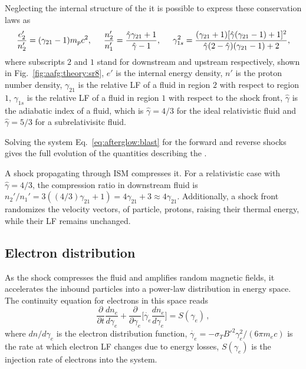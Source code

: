 Neglecting the internal structure of the \blast{} it is possible to express 
these conservation laws as \citep{Blandford:1976,Rezzolla:2013} 
\begin{equation}
\frac{e_2'}{n_2'} = (\gamma_{21} - 1)m_p c^2, \hspace{5mm}
\frac{n_2'}{n_1'} = \frac{\hat{\gamma}\gamma_{21} + 1}{\hat{\gamma}-1}, \hspace{5mm}
\gamma_{1s}^2 = \frac{(\gamma_{21} + 1) [\hat{\gamma}(\gamma_{21}-1)+1]^2}{\hat{\gamma}(2-\hat{\gamma})(\gamma_{21}-1)+2},
\label{eq:afterglow:blast}
\end{equation}
where subscripts $2$ and $1$ stand for downstream and upstream respectively, 
shown in Fig.~\ref{fig:aafg:theory:sr8}, 
$e'$ is the internal energy density, $n'$ is the proton number density, 
$\gamma_{21}$ is the relative \ac{LF} of a fluid in region $2$ with respect to region $1$, 
$\gamma_{1s}$ is the relative \ac{LF} of a fluid in region $1$ with respect to the shock front,
$\hat{\gamma}$ is the adiabatic index of a fluid, which is $\hat{\gamma}=4/3$ 
for the ideal relativistic fluid and $\hat{\gamma}=5/3$ for a subrelativisitc fluid.

Solving the system Eq.~\eqref{eq:afterglow:blast} for the 
forward and reverse shocks gives the full evolution of the quantities describing the \blast{}. 

A shock propagating through \ac{ISM} compresses it. 
For a relativistic case with $\hat{\gamma}=4/3$, the compression ratio in downstream fluid is 
$n_2'/n_1' = 3 ((4/3)\gamma_{21} + 1) = 4\gamma_{21} + 3 \approx 4 \gamma_{21}$. 
%
Additionally, a shock front randomizes the velocity vectors,
of particle, protons, raising their thermal energy, while their \ac{LF} remains
unchanged.


\subsection{Electron distribution}

As the shock compresses the fluid and amplifies random magnetic fields, it accelerates the 
inbound particles into a power-law distribution in energy space. 
%
The continuity equation for electrons in this space reads \citep{Kumar:2014upa} 
\begin{equation}
\label{eq:intro:electron_dist_cont_eq}
\frac{\partial }{\partial t}\frac{d n_e}{d\gamma_e} + \frac{\partial}{\partial \gamma_e}\Big[ \dot{\gamma_e}\frac{dn_e}{d\gamma_e} \Big] = S(\gamma_e)\, ,
\end{equation}
%
where $dn/d\gamma_e$ is the electron distribution function, 
$\dot{\gamma_e} = -\sigma_T B'^2 \gamma_e^2 / (6\pi m_e c)$ is the rate at 
which electron \ac{LF} changes due to energy losses, $S(\gamma_e)$ is the injection 
rate of electrons into the system.

